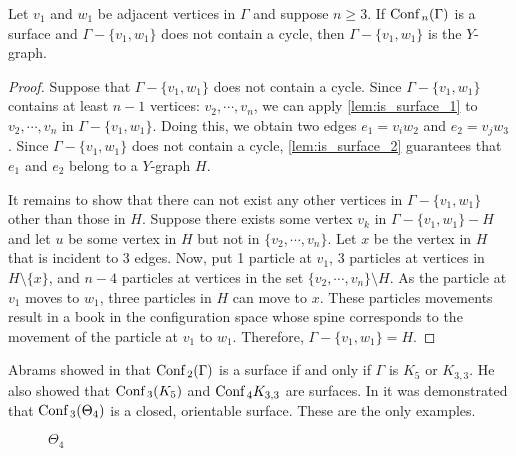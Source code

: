 \begin{lem}
\label{lem:is_surface_Y}
Let \(v_1\) and \(w_1\) be adjacent vertices in \(\Gamma\) and suppose \(n \ge 3\).
If \(\text{Conf}\,_n(\Gamma)\) is a surface and \(\Gamma - \{v_1, w_1\}\) does not contain a cycle, then \(\Gamma - \{v_1, w_1\}\) is the \(Y\)-graph.
\end{lem}
\begin{proof}
Suppose that \(\Gamma - \{v_1, w_1\}\) does not contain a cycle.
Since \(\Gamma - \{v_1, w_1\}\) contains at least \(n - 1\) vertices: \(v_2, \cdots, v_n\), 
we can apply \ref{lem:is_surface_1} to \(v_2, \cdots, v_n\) in \(\Gamma - \{v_1, w_1\}\).
Doing this, we obtain two edges \(e_1 = v_i w_2\) and \(e_2 = v_j w_3\).
Since \(\Gamma - \{v_1, w_1\}\) does not contain a cycle, \ref{lem:is_surface_2} guarantees that
\(e_1\) and \(e_2\) belong to a \(Y\)-graph \(H\).

It remains to show that there can not exist any other vertices in \(\Gamma - \{v_1, w_1\}\) other than those in \(H\).
Suppose there exists some vertex \(v_k\) in \(\Gamma - \{v_1, w_1\} - H\) and let \(u\) be some vertex in \(H\) but not in \(\{v_2, \cdots, v_n\}\).
Let \(x\) be the vertex in \(H\) that is incident to \(3\) edges.
Now, put 1 particle at \(v_1\), \(3\) particles at vertices in \(H \setminus \{x\}\),
and \(n-4\) particles at vertices in the set \(\{v_2, \cdots, v_n\}\setminus H\).
As the particle at \(v_1\) moves to \(w_1\),
three particles in \(H\) can move to \(x\).
These particles movements result in a book in the configuration space whose spine
corresponds to the movement of the particle at \(v_1\) to \(w_1\).
Therefore, \(\Gamma - \{v_1, w_1\} = H\).
\end{proof}

Abrams showed in \cite{abrams2000configurationspaces} that \(\text{Conf}\,_2(\Gamma)\) is a surface if and only if \(\Gamma\) is \(K_5\) or \(K_{3,3}\).
He also showed that \(\text{Conf}\,_3(K_5)\) and \(\text{Conf}\,_4{K_{3,3}}\) are surfaces.
In \cite{appiah2024algebraicstructurehyperbolicgraph} it was demonstrated that \(\text{Conf}\,_3(\Theta_4)\) is a closed, orientable surface.
These are the only examples.

\begin{figure}
    \centering
{}
\caption{\(\Theta_4\)}
\label{fig:Theta_4}
\end{figure}

